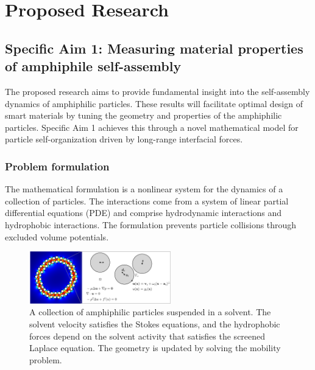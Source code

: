 \section{Proposed Research}
\label{sec:proposed-work}

\subsection{Specific Aim 1: Measuring material properties of amphiphile
  self-assembly}
\label{subsec:specific_aim_1}

The proposed research aims to provide fundamental insight into the
self-assembly dynamics of amphiphilic particles. These results will
facilitate optimal design of smart materials by tuning the geometry and
properties of the amphiphilic particles.  Specific Aim 1 achieves this
through a novel mathematical model for particle self-organization driven
by long-range interfacial forces. 

\subsubsection{Problem formulation}
The mathematical formulation is a nonlinear system for the dynamics of a
collection of particles. The interactions come from a system of linear
partial differential equations (PDE) and comprise hydrodynamic
interactions and hydrophobic interactions.  The formulation prevents
particle collisions through excluded volume potentials. 

\begin{figure}
  \centering
  \vspace{-20pt}
  \includegraphics[width=0.55\textwidth]{figures/SpecificAim1/Domain.pdf}
  \caption{\label{fig:flow_map} A collection of amphiphilic particles
  suspended in a solvent. The solvent velocity satisfies the Stokes
  equations, and the hydrophobic forces depend on the solvent activity
  that satisfies the screened Laplace equation. The geometry is updated
  by solving the mobility problem.}
\end{figure}

